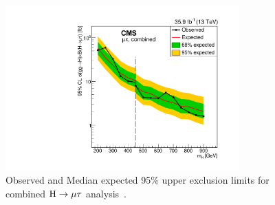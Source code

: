 \begin{figure}[!htpb]\centering
 \includegraphics[width=0.8\textwidth]{plots_and_figures/chapter8/highmass/Figure_005-c.pdf}
\caption{Observed and Median expected 95\% upper exclusion limits for combined $\text{H} \to \mu \tau$ analysis~\cite{HIG-18-017}.}
 \label{fig:limits_Hmu}
\end{figure}



%
% 
% 

